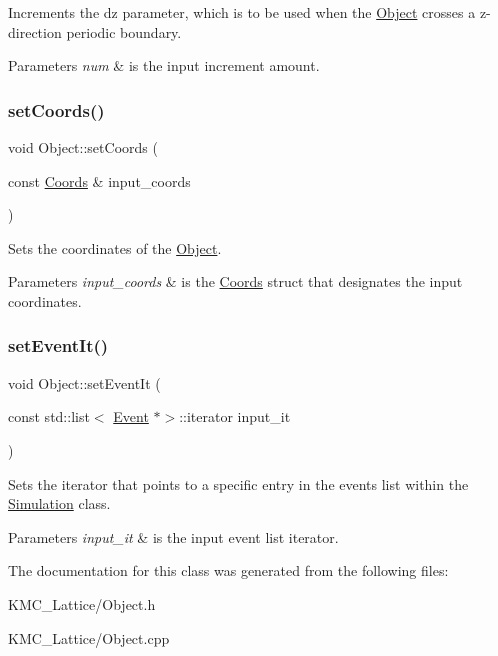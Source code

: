 Increments the dz parameter, which is to be used when the \hyperlink{class_object}{Object} crosses a z-\/direction periodic boundary. 


\begin{DoxyParams}{Parameters}
{\em num} & is the input increment amount. \\
\hline
\end{DoxyParams}
\mbox{\label{class_object_a34a164e4709e5daaba7a38c3d61ae617}} 
\subsubsection{\texorpdfstring{set\+Coords()}{setCoords()}}
{\footnotesize\ttfamily void Object\+::set\+Coords (\begin{DoxyParamCaption}\item[{const \hyperlink{struct_coords}{Coords} \&}]{input\+\_\+coords }\end{DoxyParamCaption})}



Sets the coordinates of the \hyperlink{class_object}{Object}. 


\begin{DoxyParams}{Parameters}
{\em input\+\_\+coords} & is the \hyperlink{struct_coords}{Coords} struct that designates the input coordinates. \\
\hline
\end{DoxyParams}
\mbox{\label{class_object_ad5025bd84ae91d6426f458f32e582293}} 
\subsubsection{\texorpdfstring{set\+Event\+It()}{setEventIt()}}
{\footnotesize\ttfamily void Object\+::set\+Event\+It (\begin{DoxyParamCaption}\item[{const std\+::list$<$ \hyperlink{class_event}{Event} $\ast$$>$\+::iterator}]{input\+\_\+it }\end{DoxyParamCaption})}



Sets the iterator that points to a specific entry in the events list within the \hyperlink{class_simulation}{Simulation} class. 


\begin{DoxyParams}{Parameters}
{\em input\+\_\+it} & is the input event list iterator. \\
\hline
\end{DoxyParams}


The documentation for this class was generated from the following files\+:\begin{DoxyCompactItemize}
\item 
K\+M\+C\+\_\+\+Lattice/Object.\+h\item 
K\+M\+C\+\_\+\+Lattice/Object.\+cpp\end{DoxyCompactItemize}
